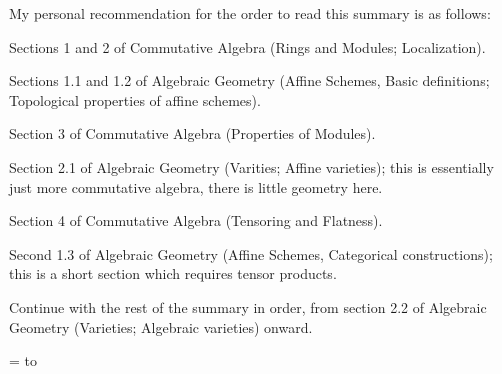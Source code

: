 {    My personal recommendation for the order to read this summary is as follows:
    \benum
        \item Sections 1 and 2 of Commutative Algebra (Rings and Modules; Localization).
        \item Sections 1.1 and 1.2 of Algebraic Geometry (Affine Schemes, Basic definitions; Topological properties of affine schemes).
        \item Section 3 of Commutative Algebra (Properties of Modules).
        \item Section 2.1 of Algebraic Geometry (Varities; Affine varieties); this is essentially just more commutative algebra, there is little geometry here.
        \item Section 4 of Commutative Algebra (Tensoring and Flatness).
        \item Second 1.3 of Algebraic Geometry (Affine Schemes, Categorical constructions); this is a short section which requires tensor products.
        \item Continue with the rest of the summary in order, from section 2.2 of Algebraic Geometry (Varieties; Algebraic varieties) onward.
    \eenum

\eppbox}

\vfill\break

\color{black}

\newif\ifpageodd
\pageoddtrue
\headline={%
    \hbox to \hsize{\color{black}%
        \ifpageodd\hfil{\it\currsubsection\quad\bf\folio}\global\pageoddfalse%
        \else{\bf\folio\quad\it\currsubsection}\hfil\global\pageoddtrue\fi%
    }%
}




\vfill\break


\bye

